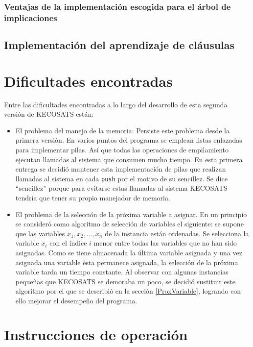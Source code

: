 \documentclass[12pt,lettersize,oneside]{article}
\begin{document}
\subsubsection{Ventajas de la implementación escogida para el árbol de implicaciones}


\subsection{Implementación del aprendizaje de cláusulas}
\newpage

\section{Dificultades encontradas}
Entre las dificultades encontradas a lo largo del desarrollo de esta segunda
versión de KECOSATS están:
\begin{itemize}
\item El problema del manejo de la memoria: Persiste este problema desde la
  primera versión. En varios puntos del programa se emplean listas enlazadas
  para implementar pilas. Así que todas las operaciones de empilamiento ejecutan
  llamadas al sistema que consumen mucho tiempo. En esta primera entrega se
  decidió mantener esta implementación de pilas que realizan llamadas al sistema
  en cada {\tt push} por el motivo de su sencillez. Se dice ``sencillez'' porque
  para evitarse estas llamadas al sistema KECOSATS tendría que tener su propio
  manejador de memoria.
\item El problema de la selección de la próxima variable a asignar. En un
  principio se consideró como algoritmo de selección de variables el siguiente:
  se supone que las variables $x_1,x_2,\ldots,x_n$ de la instancia están
  ordenadas. Se selecciona la variable $x_i$ con el índice $i$ menor entre todas
  las variables que no han sido asignadas. Como se tiene almacenada la última
  variable asignada y una vez asignada una variable ésta permanece asignada, la
  selección de la próxima variable tarda un tiempo constante. Al observar con
  algunas instancias pequeñas que KECOSATS se demoraba un poco, se decidió
  sustituir este algoritmo por el que se describió en la sección
  \ref{ProxVariable}, logrando con ello mejorar el desempeño del programa.
\end{itemize}

\section{Instrucciones de operación}
\end{document}

